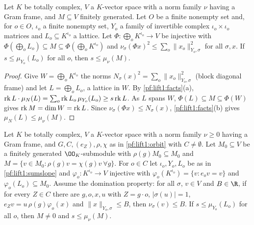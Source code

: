 \begin{lemma}\label{pf:lift1:sumslope}
Let $K$ be totally complex, $V$ a $K$-vector space with a norm family $\nu$ having a Gram frame, and
$M\subseteq V$ finitely generated. Let $O$ be a finite nonempty set and, for $o\in O$, $\iota_o$ a finite
nonempty set, $Y_o$ a family of invertible complex $\iota_o\times\iota_o$ matrices and
$L_o\subseteq K^{\iota_o}$ a lattice. Let $\Phi\colon\bigoplus_oK^{\iota_o}\to V$ be injective with
$\Phi(\bigoplus_oL_o)\subseteq M\subseteq\Phi(\bigoplus_oK^{\iota_o})$ and
$\nu_\sigma(\Phi x)^2\le\sum_o\|x_o\|_{Y_o,\sigma}^2$ for all $\sigma,x$. If $s\le\mu_{Y_o}(L_o)$ for all
$o$, then $s\le\mu_\nu(M)$.
\end{lemma}

\begin{proof}
Give $W=\bigoplus_oK^{\iota_o}$ the norms $N_\sigma(x)^2=\sum_o\|x_o\|^2_{Y_o,\sigma}$ (block diagonal
frame) and let $L=\bigoplus_oL_o$, a lattice in $W$. By \cref{pf:lift1:facts}(a),
$\operatorname{rk} L\cdot\mu_N(L)=\sum_o\operatorname{rk} L_o\,\mu_{Y_o}(L_o)\ge s\operatorname{rk} L$. As $L$ spans $W$,
$\Phi(L)\subseteq M\subseteq\Phi(W)$ gives $\operatorname{rk} M=\dim W=\operatorname{rk} L$. Since
$\nu_\sigma(\Phi x)\le N_\sigma(x)$, \cref{pf:lift1:facts}(b) gives $\mu_N(L)\le\mu_\nu(M)$.
\end{proof}

\begin{lemma}\label{pf:lift1:sloeig}
Let $K$ be totally complex, $V$ a $K$-vector space with a norm family $\nu\ge0$ having a Gram frame,
and $G,C,(e_Z),\rho,\chi$ as in \cref{pf:lift1:orbit} with $C\ne\emptyset$. Let $M_0\subseteq V$ be a
finitely generated $\OO_K$-submodule with $\rho(g)M_0\subseteq M_0$ and
$M=\{v\in M_0:\rho(g)v=\chi(g)v\ \forall g\}$. For $o\in C$ let $\iota_o,Y_o,L_o$ be as in
\cref{pf:lift1:sumslope} and $\varphi_o\colon K^{\iota_o}\to V$ injective with
$\varphi_o(K^{\iota_o})=\{v:e_ov=v\}$ and $\varphi_o(L_o)\subseteq M_0$. Assume the domination property:
for all $\sigma$, $v\in V$ and $B\in\R$, if for every $Z\in C$ there are $g,o,x,u$ with $Z=g\cdot o$,
$|\sigma(u)|=1$, $e_Zv=u\,\rho(g)\varphi_o(x)$ and $\|x\|_{Y_o,\sigma}\le B$, then $\nu_\sigma(v)\le B$.
If $s\le\mu_{Y_o}(L_o)$ for all $o$, then $M\ne0$ and $s\le\mu_\nu(M)$.
\end{lemma}

